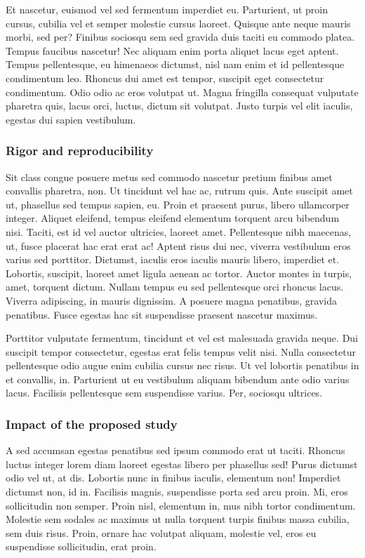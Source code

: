\documentclass[11pt,]{article}
\begin{document}
Et nascetur, euismod vel sed fermentum imperdiet eu. Parturient, ut
proin cursus, cubilia vel et semper molestie cursus laoreet. Quisque
ante neque mauris morbi, sed per? Finibus sociosqu sem sed gravida duis
taciti eu commodo platea. Tempus faucibus nascetur! Nec aliquam enim
porta aliquet lacus eget aptent. Tempus pellentesque, eu himenaeos
dictumst, nisl nam enim et id pellentesque condimentum leo. Rhoncus dui
amet est tempor, suscipit eget consectetur condimentum. Odio odio ac
eros volutpat ut. Magna fringilla consequat vulputate pharetra quis,
lacus orci, luctus, dictum sit volutpat. Justo turpis vel elit iaculis,
egestas dui sapien vestibulum.

\hypertarget{rigor-and-reproducibility}{%
\subsubsection{Rigor and
reproducibility}\label{rigor-and-reproducibility}}

Sit class congue posuere metus sed commodo nascetur pretium finibus amet
convallis pharetra, non. Ut tincidunt vel hac ac, rutrum quis. Ante
suscipit amet ut, phasellus sed tempus sapien, eu. Proin et praesent
purus, libero ullamcorper integer. Aliquet eleifend, tempus eleifend
elementum torquent arcu bibendum nisi. Taciti, est id vel auctor
ultricies, laoreet amet. Pellentesque nibh maecenas, ut, fusce placerat
hac erat erat ac! Aptent risus dui nec, viverra vestibulum eros varius
sed porttitor. Dictumst, iaculis eros iaculis mauris libero, imperdiet
et. Lobortis, suscipit, laoreet amet ligula aenean ac tortor. Auctor
montes in turpis, amet, torquent dictum. Nullam tempus eu sed
pellentesque orci rhoncus lacus. Viverra adipiscing, in mauris
dignissim. A posuere magna penatibus, gravida penatibus. Fusce egestas
hac sit suspendisse praesent nascetur maximus.

Porttitor vulputate fermentum, tincidunt et vel est malesuada gravida
neque. Dui suscipit tempor consectetur, egestas erat felis tempus velit
nisi. Nulla consectetur pellentesque odio augue enim cubilia cursus nec
risus. Ut vel lobortis penatibus in et convallis, in. Parturient ut eu
vestibulum aliquam bibendum ante odio varius lacus. Facilisis
pellentesque sem suspendisse varius. Per, sociosqu ultrices.

\hypertarget{impact-of-the-proposed-study}{%
\subsubsection{Impact of the proposed
study}\label{impact-of-the-proposed-study}}

A sed accumsan egestas penatibus sed ipsum commodo erat ut taciti.
Rhoncus luctus integer lorem diam laoreet egestas libero per phasellus
sed! Purus dictumst odio vel ut, at dis. Lobortis nunc in finibus
iaculis, elementum non! Imperdiet dictumst non, id in. Facilisis magnis,
suspendisse porta sed arcu proin. Mi, eros sollicitudin non semper.
Proin nisl, elementum in, mus nibh tortor condimentum. Molestie sem
sodales ac maximus ut nulla torquent turpis finibus massa cubilia, sem
duis risus. Proin, ornare hac volutpat aliquam, molestie vel, eros eu
suspendisse sollicitudin, erat proin.
\end{document}
